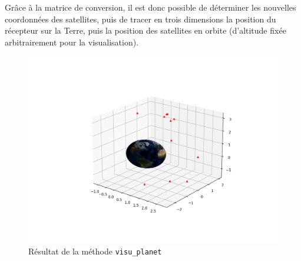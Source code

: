       Grâce à la matrice de conversion, il est donc possible de déterminer les nouvelles coordonnées des satellites, puis de tracer en trois dimensions la position du récepteur sur la Terre, puis la position des satellites en orbite (d'altitude fixée arbitrairement pour la visualisation).

      \begin{figure}[h]
          \centering
          \includegraphics[width=.7\textwidth]{imgs/visuplanet}
          \caption{Résultat de la méthode \texttt{visu\_planet}}
          \label{fig:visuplanet}
      \end{figure}